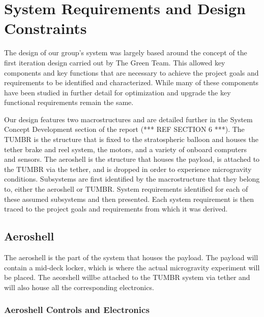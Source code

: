 
\section{\label{sys_reqs}System Requirements and Design Constraints}

\indent\indent The design of our group's system was largely based around the concept of the first iteration design carried out by The Green Team. This allowed key components and key functions that are necessary to achieve the project goals and requirements to be identified and characterized. While many of these components have been studied in further detail for optimization and upgrade the key functional requirements remain the same.

\indent\indent Our design features two macrostructures and are detailed further in the System Concept Development section of the report (*** REF SECTION 6 ***). The TUMBR is the structure that is fixed to the stratospheric balloon and houses the tether brake and reel system, the motors, and a variety of onboard computers and sensors. The aeroshell is the structure that houses the payload, is attached to the TUMBR via the tether, and is dropped in order to experience microgravity conditions. Subsystems are first identified by the macrostructure that they belong to, either the aeroshell or TUMBR. System requirements identified for each of these assumed subsystems and then presented. Each system requirement is then traced to the project goals and requirements from which it was derived.

\subsection{Aeroshell}

\indent\indent The aeroshell is the part of the system that houses the payload. The payload will contain a mid-deck locker, which is where the actual microgravity experiment will be placed. The aeorshell willbe attached to the TUMBR system via tether and will also house all the corresponding electronics.

\subsubsection{Aeroshell Controls and Electronics}

